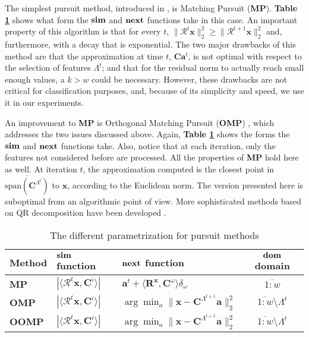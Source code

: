 \documentclass[12pt,a4paper,oneside,english]{UPBThesis}
\newcommand{\hcrange}[2]{\overline{{#1}\colon\!\!{#2}}}
\begin{document}
The simplest pursuit method, introduced in \cite{matchingpursuit1}, is Matching Pursuit (\textbf{MP}). \textbf{Table \ref{table:PursuitParametrization}} shows what form the $\text{\textbf{sim}}$ and $\text{\textbf{next}}$ functions take in this case. An important property of this algorithm is that for every $t$, $\|\mathcal{R}^t\textbf{x}\|_2^2 \geq \|\mathcal{R}^{t+1}\textbf{x}\|_2^2$ and, furthermore, with a decay that is exponential. The two major drawbacks of this method are that the approximation at time $t$, $\textbf{C}\textbf{a}^t$, is not optimal with respect to the selection of features $\Lambda^t$; and that for the residual norm to actually reach small enough values, a $k > w$ could be necessary. However, these drawbacks are not critical for classification purposes, and, because of its simplicity and speed, we use it in our experiments.

An improvement to \textbf{MP} is Orthogonal Matching Pursuit (\textbf{OMP}) \cite{matchingpursuit2,orthopursuit,pursuitdifferences}, which addresses the two issues discussed above. Again, \textbf{Table \ref{table:PursuitParametrization}} shows the forms the $\text{\textbf{sim}}$ and $\text{\textbf{next}}$ functions take. Also, notice that at each iteration, only the features not considered before are processed. All the properties of \textbf{MP} hold here as well. At iteration $t$, the approximation computed is the closest point in $\overline{\text{span}(\textbf{C}^{\Lambda^t})}$ to $\textbf{x}$, according to the Euclidean norm. The version presented here is suboptimal from an algorithmic point of view. More sophisticated methods based on QR decomposition have been developed \cite{matchingpursuit2,pursuitdifferences}.

\renewcommand{\arraystretch}{1.5}
\begin{table}
  \caption{The different parametrization for pursuit methods}
  \label{table:PursuitParametrization}
  \begin{tabularx}{\textwidth}{|l|>{\centering}X|>{\centering}X|c|}
       \hline
        Method & $\text{\textbf{sim}}$ function & $\text{\textbf{next}}$ function & $\text{\textbf{dom}}$ domain\\ \hline \hline
        \textbf{MP} & $\left| \langle \mathcal{R}^t\textbf{x} , \textbf{C}^i \rangle \right|$ & $\textbf{a}^t + \langle \textbf{R}^\textbf{x} , \textbf{C}^\omega \rangle \delta_\omega$ & $\hcrange{1}{w}$ \\  \hline
        \textbf{OMP} & $\left| \langle \mathcal{R}^t\textbf{x} , \textbf{C}^i \rangle \right|$ & $\arg\min_{a} {\| \textbf{x} - \textbf{C}^{\Lambda^{t+1}}\textbf{a} \|_2^2}$ & $\hcrange{1}{w} \setminus \Lambda^t$ \\ \hline
        \textbf{OOMP} & $\left| \langle \mathcal{R}^t\textbf{x} , \textbf{C}^i \rangle \right|$ & $\arg\min_{a} {\| \textbf{x} - \textbf{C}^{\Lambda^{t+1}}\textbf{a} \|_2^2}$ & $\hcrange{1}{w} \setminus \Lambda^t$ \\
       \hline
    \end{tabularx}
\end{table}
\renewcommand{\arraystretch}{1.0}
\end{document}
